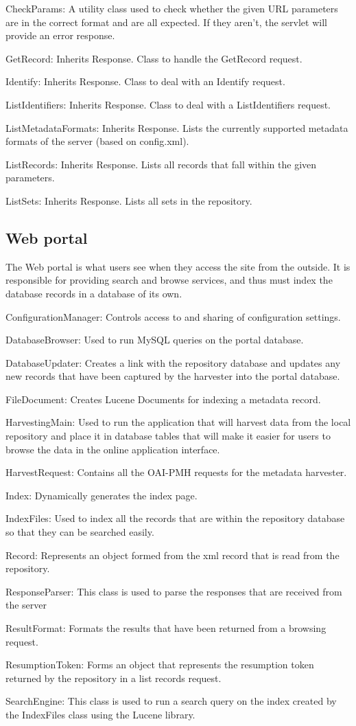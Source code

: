 \documentclass[a4paper,11pt]{article}
\begin{document}
CheckParams: A utility class used to check whether the given URL parameters are in the correct format and are all expected. If they aren't, the servlet will provide an error response.

GetRecord: Inherits Response. Class to handle the GetRecord request.

Identify: Inherits Response. Class to deal with an Identify request.

ListIdentifiers: Inherits Response. Class to deal with a ListIdentifiers request.

ListMetadataFormats: Inherits Response. Lists the currently supported metadata formats of the server (based on config.xml).

ListRecords: Inherits Response. Lists all records that fall within the given parameters.

ListSets: Inherits Response. Lists all sets in the repository.

\subsection{Web portal}

The Web portal is what users see when they access the site from the outside. It is responsible for providing search and browse services, and thus must index the database records in a database of its own.

ConfigurationManager: Controls access to and sharing of configuration settings.

DatabaseBrowser: Used to run MySQL queries on the portal database.

DatabaseUpdater: Creates a link with the repository database and updates any new records that have been captured by the harvester into the portal database.

FileDocument: Creates Lucene Documents for indexing a metadata record.

HarvestingMain: Used to run the application that will harvest data from the local repository and place it in database tables that will make it easier for users to browse the data in the online application interface.

HarvestRequest: Contains all the OAI-PMH requests for the metadata harvester.

Index: Dynamically generates the index page.

IndexFiles: Used to index all the records that are within the repository database so that they can be searched easily.

Record: Represents an object formed from the xml record that is read from the repository.

ResponseParser: This class is used to parse the responses that are received from the server

ResultFormat: Formats the results that have been returned from a browsing request.

ResumptionToken: Forms an object that represents the resumption token returned by the repository in a list records request.

SearchEngine: This class is used to run a search query on the index created by the IndexFiles class using the Lucene library.
\end{document}

